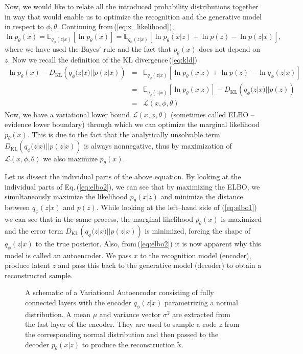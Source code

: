 Now, we would like to relate all the introduced probability distributions
together in way that would enable us to optimize the recognition and
the generative model in respect to $\phi,\theta$. Continuing from\,(\ref{eq:x_likelihood}),
\begin{equation}
\ln p_{\theta}(x)=\mathbb{E}_{q_{\phi}(z|x)}\left[\ln p_{\theta}(x)\right]=\mathbb{E}_{q_{\phi}(z|x)}\left[\ln p_{\theta}(x|z)+\ln p(z)-\ln p(z|x)\right],
\end{equation}
where we have used the Bayes' rule and the fact that $p_{\theta}(x)$
does not depend on $z$. Now we recall the definition of the KL divergence\,(\ref{eq:kld})
\begin{eqnarray}
\ln p_{\theta}(x)-D_{\text{KL}}\left(q_{\phi}(z|x)||p(z|x)\right) & = & \mathbb{E}_{q_{\phi}(z|x)}\left[\ln p_{\theta}(x|z)+\ln p(z)-\ln q_{\phi}(z|x)\right]\label{eq:elbo1}\\
 & = & \mathbb{E}_{q_{\phi}(z|x)}\left[\ln p_{\theta}(x|z)\right]-D_{\text{KL}}\left(q_{\phi}(z|x)||p(z)\right)\label{eq:elbo2}\\
 & = & \mathcal{L}(x,\phi,\theta)\label{eq:elbo3}
\end{eqnarray}
Now, we have a variational lower bound $\mathcal{L}(x,\phi,\theta)$
(sometimes called ELBO -- evidence lower boundary) through which
we can optimize the marginal likelihood $p_{\theta}(x)$. This is
due to the fact that the analytically unsolvable term $D_{\text{KL}}\left(q_{\phi}(z|x)||p(z|x)\right)$
is always nonnegative, thus by maximization of $\mathcal{L}(x,\phi,\theta)$
we also maximize $p_{\theta}(x)$.

Let us dissect the individual parts of the above equation. By looking
at the individual parts of Eq.\,(\ref{eq:elbo2}), we can see that
by maximizing the ELBO, we simultaneously maximize the likelihood
$p_{\theta}(x|z)$ and minimize the distance between $q_{\phi}(z|x)$
and $p(z)$. While looking at the left--hand side of (\ref{eq:elbo1})
we can see that in the same process, the marginal likelihood $p_{\theta}(x)$
is maximized and the error term $D_{\text{KL}}\left(q_{\phi}(z|x)||p(z|x)\right)$
is minimized, forcing the shape of $q_{\phi}(z|x)$ to the true posterior.
Also, from\,(\ref{eq:elbo2}) it is now apparent why this model is
called an autoencoder. We pass $x$ to the recognition model (encoder),
produce latent $z$ and pass this back to the generative model (decoder)
to obtain a reconstructed sample.
\begin{figure}
\centering{}\caption{A schematic of a Variational Autoencoder consisting of fully connected
layers with the encoder $q_{\phi}(z|x)$ parametrizing a normal distribution.
A mean $\mu$ and variance vector $\sigma^{2}$ are extracted from
the last layer of the encoder. They are used to sample a code $z$
from the corresponding normal distribution and then passed to the
decoder $p_{\theta}(x|z)$ to produce the reconstruction $\tilde{x}.$}
\label{fig:vae}
\end{figure}


